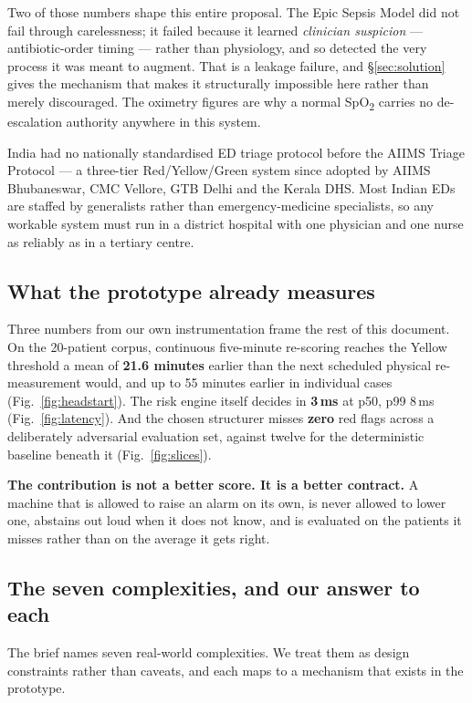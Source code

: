 \documentclass[10pt,a4paper,twocolumn]{article}
\begin{document}
\vspace{3pt}
Two of those numbers shape this entire proposal. The Epic Sepsis Model did not fail through
carelessness; it failed because it learned \emph{clinician suspicion} --- antibiotic-order timing ---
rather than physiology, and so detected the very process it was meant to augment. That is a
leakage failure, and \S\ref{sec:solution} gives the mechanism that makes it structurally impossible
here rather than merely discouraged. The oximetry figures are why a normal SpO\textsubscript{2}
carries no de-escalation authority anywhere in this system.

India had no nationally standardised ED triage protocol before the AIIMS Triage Protocol --- a
three-tier Red/Yellow/Green system since adopted by AIIMS Bhubaneswar, CMC Vellore, GTB Delhi and
the Kerala DHS. Most Indian EDs are staffed by generalists rather than emergency-medicine
specialists, so any workable system must run in a district hospital with one physician and one
nurse as reliably as in a tertiary centre.

\subsection{What the prototype already measures}
Three numbers from our own instrumentation frame the rest of this document. On the 20-patient
corpus, continuous five-minute re-scoring reaches the Yellow threshold a mean of \textbf{21.6
minutes} earlier than the next scheduled physical re-measurement would, and up to 55 minutes
earlier in individual cases (Fig.~\ref{fig:headstart}). The risk engine itself decides in
\textbf{3\,ms} at p50, p99 8\,ms (Fig.~\ref{fig:latency}). And the chosen structurer misses
\textbf{zero} red flags across a deliberately adversarial evaluation set, against twelve for the
deterministic baseline beneath it (Fig.~\ref{fig:slices}).

\begin{tcolorbox}[mpthesis]
\textbf{The contribution is not a better score. It is a better contract.} A machine that is
allowed to raise an alarm on its own, is never allowed to lower one, abstains out loud when it does
not know, and is evaluated on the patients it misses rather than on the average it gets right.
\end{tcolorbox}

\subsection{The seven complexities, and our answer to each}
The brief names seven real-world complexities. We treat them as design constraints rather than
caveats, and each maps to a mechanism that exists in the prototype.
\end{document}
